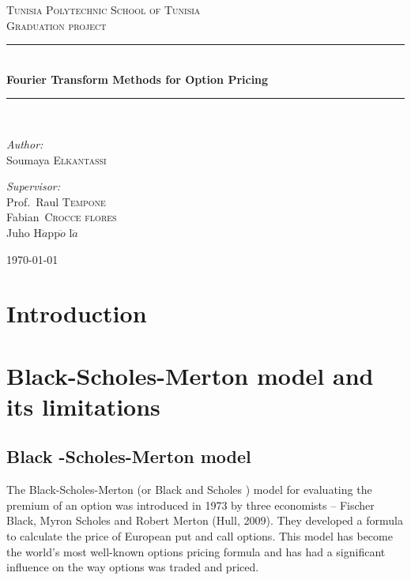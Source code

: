 \documentclass[12pt]{report}
\newcommand{\HRule}{\rule{\linewidth}{0.5mm}}
\begin{document}
\begin{titlepage}
\begin{center}
\textsc{\Large Tunisia Polytechnic School of Tunisia}\\[1.5cm]
\textsc{\Large Graduation project}\\[0.5cm]
\HRule \\[0.4cm]
{ \huge \bfseries Fourier Transform Methods for Option Pricing \\[0.4cm] }

\HRule \\[1.5cm]

\noindent
\begin{minipage}[t]{0.4\textwidth}
\begin{flushleft} \large
\emph{Author:}\\
Soumaya \textsc{Elkantassi}
\end{flushleft}
\end{minipage}%
\begin{minipage}[t]{0.6\textwidth}
\begin{flushright} \large
\emph{Supervisor:} \\
Prof.~Raul \textsc{Tempone}\\
Fabian\textsc{~Crocce flores}\\
Juho H$\ddot{a}$pp$\ddot{o}$
l$\ddot{a}
$
\end{flushright}
\end{minipage}
\vfill
{\large \today}
\end{center}
\end{titlepage}


\chapter*{Introduction}

\chapter{Black-Scholes-Merton model and its limitations}
\section{Black -Scholes-Merton model}
The Black-Scholes-Merton (or Black and Scholes ) model for evaluating the premium of an option was introduced in 1973 by three economists – Fischer Black, Myron Scholes and Robert Merton (Hull, 2009). They developed a formula to calculate the price of European put and call options. This model has become the world's most well-known options pricing formula and has had a significant influence on the way options was traded and priced.\\
\end{document}
